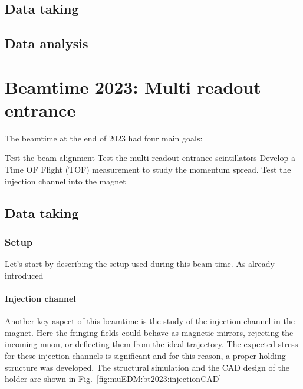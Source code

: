 \begin{refsection}
    \subsection{Data taking}
    \subsection{Data analysis}

\section{Beamtime 2023: Multi readout entrance}
\label{muEDM:beamtime2023}
    The beamtime at the end of 2023 had four main goals:
    \begin{outline}
        \1 Test the beam alignment
        \1 Test the multi-readout entrance scintillators
        \1 Develop a Time OF Flight (TOF) measurement to study the momentum spread.
        \1 Test the injection channel into the magnet
    \end{outline}

    \subsection{Data taking}
    \subsubsection{Setup}
        Let's start by describing the setup used during this beam-time.
        As already introduced 

        \paragraph{Injection channel}
        Another key aspect of this beamtime is the study of the injection channel in the magnet. 
        Here the fringing fields could behave as magnetic mirrors, rejecting the incoming muon, or deflecting them from the ideal trajectory.
        The expected stress for these injection channels is significant and for this reason, a proper holding structure was developed.
        The \ansys structural simulation and the CAD design of the holder are shown in Fig.~\ref{fig:muEDM:bt2023:injectionCAD}
        

\end{refsection}
